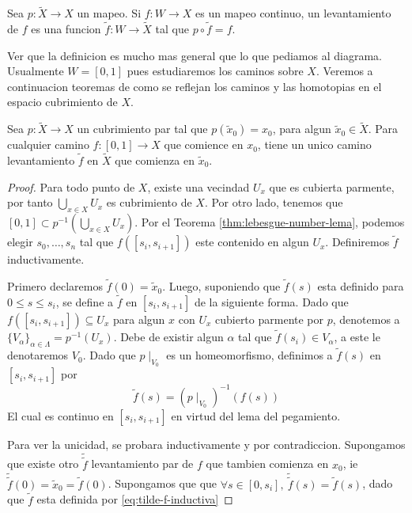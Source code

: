 \begin{definicion}[Levantamiento de \(f\)]
  Sea \(p : \tilde X \to X\) un mapeo. Si \(f : W \to X\) es un mapeo
  continuo, un levantamiento de \(f\) es una funcion \(\tilde f : W \to
  \tilde X\) tal que \(p \circ \tilde f = f\).
\end{definicion}
Ver que la definicion es mucho mas general que lo que pediamos al
diagrama. Usualmente \(W = [0,1]\) pues estudiaremos los caminos sobre
\(X\). Veremos a continuacion teoremas de como se reflejan los caminos
y las homotopias en el espacio cubrimiento de \(X\).
\begin{teorema}
  Sea \(p : \tilde X \to X\) un cubrimiento par tal que \(p(\tilde x _0)
  = x_0 \), para algun \(\tilde x _0 \in \tilde X\). Para cualquier
  camino \(f : [0,1] \to X\) que comience en \(x_0\), tiene un
  unico camino levantamiento \(\tilde f\) en \(\tilde X\) que comienza
  en \(\tilde x _0\).
\end{teorema}
\begin{proof}
  Para todo punto de \(X\), existe una vecindad \(U_x\) que es
  cubierta parmente, por tanto \(\bigcup_{x \in X} U_x\) es cubrimiento
  de \(X\). Por otro lado, tenemos que \( [0,1] \subset p^{-1}
  (\bigcup_{x \in X} U_x)\). Por el Teorema
  \ref{thm:lebesgue-number-lema}, podemos elegir \(s_0,\dotsc,s_n\) tal
  que \(f([s_i, s_{i+1}])\) este contenido en algun \(U_x\). Definiremos
  \(\tilde f\) inductivamente.

  Primero declaremos \(\tilde f (0) = \tilde x _0\). Luego, suponiendo
  que \(\tilde f (s)\) esta definido para \(0 \leq s \leq s_i\), se
  define a \(\tilde f \) en \([s_i, s_{i+1}]\) de la siguiente forma.
  Dado que \(f ([s_i, s_{i+1}]) \subseteq U_x\) para algun \(x\) con
  \(U_x\) cubierto parmente por \(p\), denotemos a
  \(\{V_\alpha\}_{\alpha \in \Lambda} = p^{-1} (U_x)\). Debe de existir
  algun \(\alpha\) tal que \(\tilde f (s_i) \in V_\alpha\), a este le
  denotaremos \(V_0\). Dado que \(p \mid_{V_0}\) es un homeomorfismo,
  definimos a \(\tilde f (s)\) en \([s_i, s_{i+1}]\) por
  \begin{equation}
  \tilde f (s) = (p \mid _{V_0})^{-1} (f(s))\label{eq:tilde-f-inductiva}
  \end{equation}
  El cual es continuo en \([s_i, s_{i+1}]\) en virtud del lema del pegamiento.

  Para ver la unicidad, se probara inductivamente y por contradiccion.
  Supongamos que existe otro \(\tilde{\tilde f}\) levantamiento par de
  \(f\) que tambien comienza en \(x_0\), ie \(\tilde{\tilde f} (0) =
  \tilde x _0 = \tilde f (0)\). Supongamos que que \(\forall s \in [0,
  s_i],\ \tilde{\tilde f} (s) = \tilde f (s)\), dado que \(\tilde f\)
  esta definida por \eqref{eq:tilde-f-inductiva}
\end{proof}
